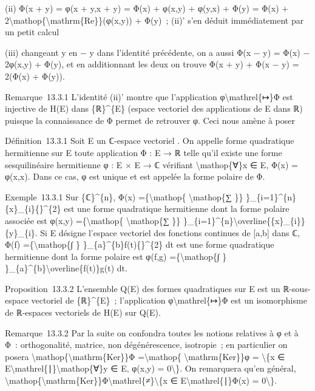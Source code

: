 \documentclass[]{article}
\begin{document}
(ii) Φ(x + y) = φ(x + y,x + y) = Φ(x) + φ(x,y) + φ(y,x) + Φ(y) = Φ(x) +
2\textbackslash{}mathop\{\textbackslash{}mathrm\{Re\}\}(φ(x,y)) + Φ(y)~;
(ii)' s'en déduit immédiatement par un petit calcul

(iii) changeant y en − y dans l'identité précédente, on a aussi Φ(x − y)
= Φ(x) − 2φ(x,y) + Φ(y), et en additionnant les deux on trouve Φ(x + y)
+ Φ(x − y) = 2(Φ(x) + Φ(y)).

Remarque~13.3.1 L'identité (ii)' montre que l'application
φ\textbackslash{}mathrel\{↦\}Φ est injective de H(E) dans \{ℝ\}\^{}\{E\}
(espace vectoriel des applications de E dans ℝ) puisque la connaissance
de Φ permet de retrouver φ. Ceci nous amène à poser

Définition~13.3.1 Soit E un ℂ-espace vectoriel . On appelle forme
quadratique hermitienne sur E toute application Φ : E → ℝ telle qu'il
existe une forme sesquilinéaire hermitienne φ : E × E → ℂ vérifiant
\textbackslash{}mathop\{∀\}x ∈ E, Φ(x) = φ(x,x). Dans ce cas, φ est
unique et est appelée la forme polaire de Φ.

Exemple~13.3.1 Sur \{ℂ\}\^{}\{n\}, Φ(x) =\{\textbackslash{}mathop\{
\textbackslash{}mathop\{∑ \}\}
\}\_\{i=1\}\^{}\{n\}\textbar{}\{x\}\_\{i\}\{\textbar{}\}\^{}\{2\} est
une forme quadratique hermitienne dont la forme polaire associée est
φ(x,y) =\{\textbackslash{}mathop\{ \textbackslash{}mathop\{∑ \}\}
\}\_\{i=1\}\^{}\{n\}\textbackslash{}overline\{\{x\}\_\{i\}\}\{y\}\_\{i\}.
Si E désigne l'espace vectoriel des fonctions continues de {[}a,b{]}
dans ℂ, Φ(f) =\{\textbackslash{}mathop\{∫ \}
\}\_\{a\}\^{}\{b\}\textbar{}f(t)\{\textbar{}\}\^{}\{2\} dt est une forme
quadratique hermitienne dont la forme polaire est φ(f,g)
=\{\textbackslash{}mathop\{∫ \}
\}\_\{a\}\^{}\{b\}\textbackslash{}overline\{f(t)\}g(t) dt.

Proposition~13.3.2 L'ensemble Q(E) des formes quadratiques sur E est un
ℝ-sous-espace vectoriel de \{ℝ\}\^{}\{E\}~; l'application
φ\textbackslash{}mathrel\{↦\}Φ est un isomorphisme de ℝ-espaces
vectoriels de H(E) sur Q(E).

Remarque~13.3.2 Par la suite on confondra toutes les notions relatives à
φ et à Φ~: orthogonalité, matrice, non dégénérescence, isotropie~; en
particulier on posera
\textbackslash{}mathop\{\textbackslash{}mathrm\{Ker\}\}Φ
=\textbackslash{}mathop\{ \textbackslash{}mathrm\{Ker\}\}φ =
\textbackslash{}\{x ∈
E\textbackslash{}mathrel\{∣\}\textbackslash{}mathop\{∀\}y ∈ E, φ(x,y) =
0\textbackslash{}\}. On remarquera qu'en général,
\textbackslash{}mathop\{\textbackslash{}mathrm\{Ker\}\}Φ\textbackslash{}mathrel\{≠\}\textbackslash{}\{x
∈ E\textbackslash{}mathrel\{∣\}Φ(x) = 0\textbackslash{}\}.
\end{document}
